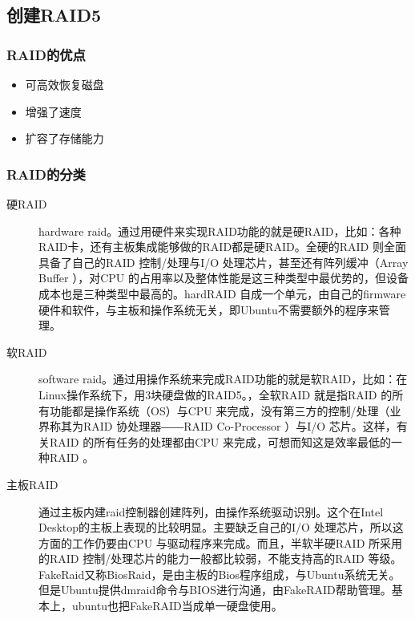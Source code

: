 \subsection{创建RAID5}
\subsubsection{RAID的优点}
\begin{itemize}
\item 可高效恢复磁盘
\item 增强了速度
\item 扩容了存储能力
\end{itemize}

\subsubsection{RAID的分类}
\begin{description}
\item[硬RAID] hardware raid。通过用硬件来实现RAID功能的就是硬RAID，比如：各种RAID卡，还有主板集成能够做的RAID都是硬RAID。全硬的RAID 则全面具备了自己的RAID 控制/处理与I/O 处理芯片，甚至还有阵列缓冲（Array Buffer ），对CPU 的占用率以及整体性能是这三种类型中最优势的，但设备成本也是三种类型中最高的。hardRAID 自成一个单元，由自己的firmware硬件和软件，与主板和操作系统无关，即Ubuntu不需要额外的程序来管理。
\item[软RAID] software raid。通过用操作系统来完成RAID功能的就是软RAID，比如：在Linux操作系统下，用3块硬盘做的RAID5。，全软RAID 就是指RAID 的所有功能都是操作系统（OS）与CPU 来完成，没有第三方的控制/处理（业界称其为RAID 协处理器――RAID Co-Processor ）与I/O 芯片。这样，有关RAID 的所有任务的处理都由CPU 来完成，可想而知这是效率最低的一种RAID 。
\item[主板RAID] 通过主板内建raid控制器创建阵列，由操作系统驱动识别。这个在Intel Desktop的主板上表现的比较明显。主要缺乏自己的I/O 处理芯片，所以这方面的工作仍要由CPU 与驱动程序来完成。而且，半软半硬RAID 所采用的RAID 控制/处理芯片的能力一般都比较弱，不能支持高的RAID 等级。FakeRaid又称BiosRaid，是由主板的Bios程序组成，与Ubuntu系统无关。但是Ubuntu提供dmraid命令与BIOS进行沟通，由FakeRAID帮助管理。基本上，ubuntu也把FakeRAID当成单一硬盘使用。
\end{description}

